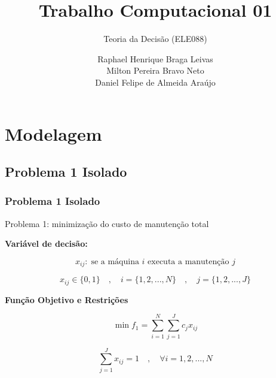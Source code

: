 \documentclass{beamer}
\title[Short Paper Title]  
{Trabalho Computacional 01}
\subtitle
{Teoria da Decisão (ELE088)}
\author 
 { Raphael Henrique Braga Leivas \\
 Milton Pereira Bravo Neto \\ 
 Daniel Felipe de Almeida Araújo}
\institute 
{
Curso de Bacharelado em Engenharia de Sistemas\\
Universidade Federal de Minas Gerais
}
\date{}
\newcommand{\un}[1]{\;\text{#1}}
\begin{document}
\begin{frame}
    \titlepage
\end{frame}

\section{Modelagem}
    


    \subsection{Problema 1 Isolado}
    \begin{frame}
        \frametitle{Problema 1 Isolado}

        \begin{center}
            Problema 1: minimização do custo de manutenção total
        \end{center}

        \vspace{0.5cm}

        \textbf{Variável de decisão:}

        \[  x_{ij}: \un{se a máquina $i$ executa a manutenção $j$}  \]
        
        \[ x_{ij} \in \{0,1\} \quad , \quad i = \{1, 2, ..., N\}  \quad , \quad j = \{1, 2, ..., J\} \]

        \vspace{0.5cm}

        \textbf{Função Objetivo e Restrições}

        \[  \min f_1 = \sum_{i=1}^{N} \sum_{j=1}^{J} c_j x_{ij} \]

        \[ \sum_{j=1}^{J} x_{ij} = 1 \quad , \quad \forall i = {1, 2, ..., N} \]
    \end{frame}
\end{document}
